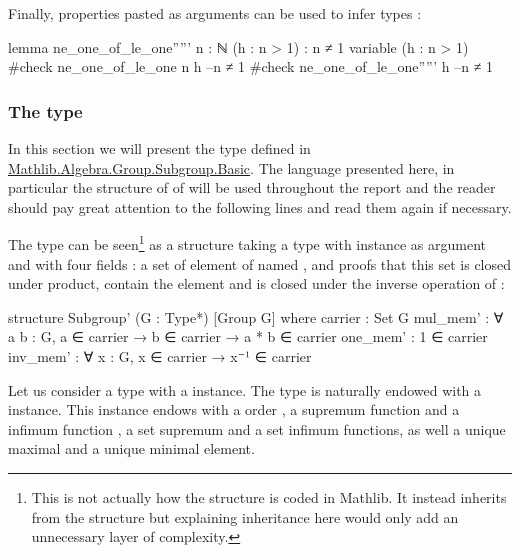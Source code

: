Finally, properties pasted as arguments can be used to infer types :
\begin{leancode}
lemma ne_one_of_le_one''''' {n : ℕ} (h : n > 1) : n ≠ 1
variable (h : n > 1)
#check ne_one_of_le_one n h --n ≠ 1
#check ne_one_of_le_one''''' h --n ≠ 1
\end{leancode}

\subsubsection{The  type}
\label{subsub:subgroup}
In this section we will present the type  defined in \href{https://github.com/leanprover-community/mathlib4/blob/318082b0bccc3abd9d654496f7b60267f277d5fd/Mathlib/Algebra/Group/Subgroup/Basic.lean}{Mathlib.Algebra.Group.Subgroup.Basic}.
The language presented here, in particular the structure of  of  will be used throughout the report and the reader should pay great attention to the following lines and read them again if necessary.

The  type can be seen\footnote{This is not actually how the  structure is coded in Mathlib. It instead inherits from the  structure but explaining inheritance here would only add an unnecessary layer of complexity.} as a structure taking a type  with \lean{[Group G]} instance as argument and with four fields : a set of element of  named , and proofs that this set is closed under product, contain the element  and is closed under the inverse operation of  :

\begin{leancode}
structure Subgroup' (G : Type*) [Group G] where
    carrier : Set G
    mul_mem' : ∀ {a b : G}, a ∈ carrier → b ∈ carrier → a * b ∈ carrier
    one_mem' : 1 ∈ carrier
    inv_mem' : ∀ {x : G}, x ∈ carrier → x⁻¹ ∈ carrier
\end{leancode}

Let us consider a type  with a \lean{[Group G]} instance.
The type  is naturally endowed with a  instance. This instance endows  with a order , a supremum function  and a infimum function  , a set supremum  and a set infimum  functions, as well a unique maximal  and a unique minimal  element.


